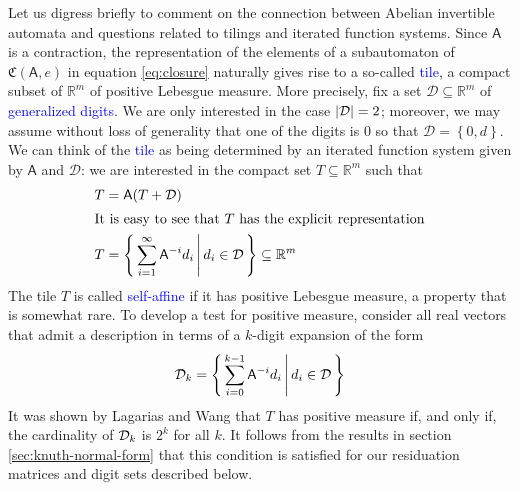 \documentclass[12pt]{svmult}
\def\emph#1{\textcolor{blue}{#1}}
\def\DD{\mathcal{D}}            %
\def\R{\mathbb{R}}
\def\Set#1#2{\left\{\, {#1} \,\middle|\, {#2}\,\right\}}
\def\setof#1{\left\{ {#1} \right\}}
\def\AA{\mathsf{A}}             %
\def\Ai{\mathsf{A}^{-1}}        %
\def\cmpaut{\fC}                %
\def\fC{\mathfrak{C}}           %
\DeclarePairedDelimiter\card{|}{|}
\begin{document}
Let us digress briefly to comment on the connection between Abelian invertible automata and 
questions related to tilings and iterated function systems. 
Since $\AA$ is a contraction, the representation of the elements of a subautomaton of 
$\cmpaut(\AA,e)$ in equation \eqref{eq:closure} naturally gives rise to a 
so-called \emph{tile}, a compact subset of $\R^m$ of positive Lebesgue measure. 
More precisely, fix a set $\DD \subseteq \R^{m}$ of \emph{ generalized digits}.
We are only interested in the case $\card{\DD} = 2$; moreover,  
we may assume without loss of generality that one of the digits is $0$ so that 
$\DD = \setof{0,d}$. 
We can think of the \emph{tile} as being determined by an iterated function system 
given by $\AA$ and $\DD$: we are interested in the compact set $T \subseteq \R^{m}$ 
such that 
%
\begin{align}
\label{eq:tile}
     T &=  \AA (T + \DD) \\
\intertext{It is easy to see that $T$ has the explicit representation}
     T &=  \Set{ \sum_{i=1}^{\infty} \AA^{-i} d_{i}}{ d_{i} \in \DD } \subseteq \R^{m}
\end{align}
%
The tile $T$ is called \emph{self-affine} if it has positive Lebesgue measure, 
a property that is somewhat rare.  
To develop a test for positive measure, consider all real vectors that admit a
description in terms of a $k$-digit expansion of the form 
%
\begin{equation}
\label{eq:dnumbs}
\Dnumb{k} = \Set{ \sum_{i=0}^{k-1} \AA^{-i} d_{i}}{ d_{i} \in \DD }
\end{equation}
%
It was shown by Lagarias and Wang \cite{LagariasWang96:tiles,LagariasWang97:integral_tiles} 
that $T$ has positive measure if, and only if, the cardinality of $\Dnumb{k}$ is $2^{k}$ 
for all $k$. 
It follows from the results in section \ref{sec:knuth-normal-form} that this condition is 
satisfied for our residuation matrices and digit sets described below. 
\end{document}
